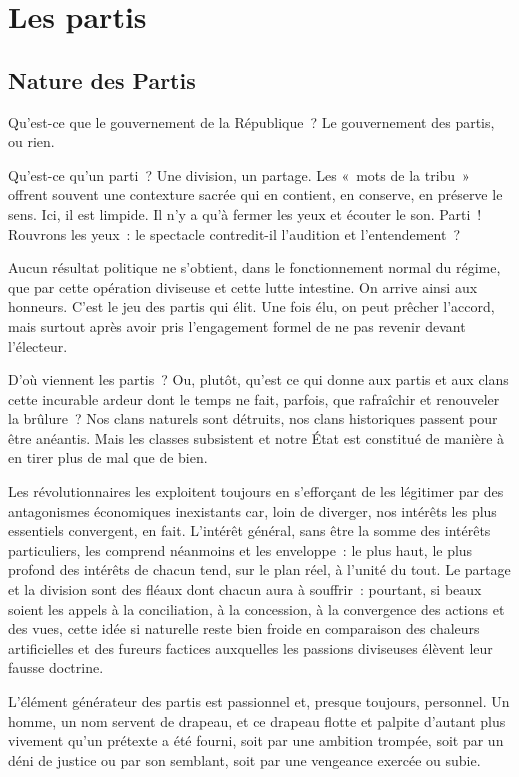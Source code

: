 \documentclass[french,twoside]{book} %
\newcommand{\astermono}{\medskip\centerline{\color{rubric}\large\selectfont{\syms ✻}}\medskip\par}%
\begin{document}
\section[Les partis]{Les partis}
\subsection[Nature des Partis]{Nature des Partis}
\noindent Qu’est-ce que le gouvernement de la République ? Le gouvernement des partis, ou rien.\par
Qu’est-ce qu’un parti ? Une division, un partage. Les « mots de la tribu » offrent souvent une contexture sacrée qui en contient, en conserve, en préserve le sens. Ici, il est limpide. Il n’y a qu’à fermer les yeux et écouter le son. Parti ! Rouvrons les yeux : le spectacle contredit-il l’audition et l’entendement ?\par
Aucun résultat politique ne s’obtient, dans le fonctionnement normal du régime, que par cette opération diviseuse et cette lutte intestine. On arrive ainsi aux honneurs. C’est le jeu des partis qui élit. Une fois élu, on peut prêcher l’accord, mais surtout après avoir pris l’engagement formel de ne pas revenir devant l’électeur.\par

\astermono

\noindent D’où viennent les partis ? Ou, plutôt, qu’est ce qui donne aux partis et aux clans cette incurable ardeur dont le temps ne fait, parfois, que rafraîchir et renouveler la brûlure ? Nos clans naturels sont détruits, nos clans historiques passent pour être anéantis. Mais les classes subsistent et notre État est constitué de manière à en tirer plus de mal que de bien.\par
Les révolutionnaires les exploitent toujours en s’efforçant de les légitimer par des antagonismes économiques inexistants car, loin de diverger, nos intérêts les plus essentiels convergent, en fait. L’intérêt général, sans être la somme des intérêts particuliers, les comprend néanmoins et les enveloppe : le plus haut, le plus profond des intérêts de chacun tend, sur le plan réel, à l’unité du tout. Le partage et la division sont des fléaux dont chacun aura à souffrir : pourtant, si beaux soient les appels à la conciliation, à la concession, à la convergence des actions et des vues, cette idée si naturelle reste bien froide en comparaison des chaleurs artificielles et des fureurs factices auxquelles les passions diviseuses élèvent leur fausse doctrine.\par
L’élément générateur des partis est passionnel et, presque toujours, personnel. Un homme, un nom servent de drapeau, et ce drapeau flotte et palpite d’autant plus vivement qu’un prétexte a été fourni, soit par une ambition trompée, soit par un déni de justice ou par son semblant, soit par une vengeance exercée ou subie.\par
\end{document}
